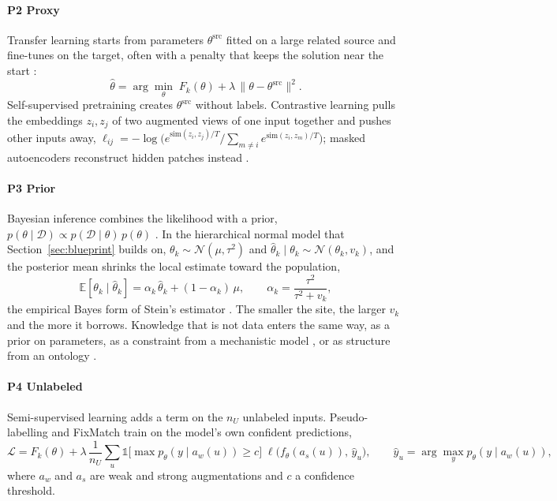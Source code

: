 \documentclass[acmsmall,screen,review]{acmart}
\theoremstyle{acmdefinition}
\begin{document}
\paragraph{P2 Proxy} Transfer learning starts from parameters $\theta^{\mathrm{src}}$ fitted on a large related source and fine-tunes on the target, often with a penalty that keeps the solution near the start \cite{pan2010survey,xuhong2018explicit}:
\begin{equation}\label{eq:finetune}
\hat\theta=\arg\min_\theta\;F_k(\theta)+\lambda\,\|\theta-\theta^{\mathrm{src}}\|^2 .
\end{equation}
Self-supervised pretraining creates $\theta^{\mathrm{src}}$ without labels. Contrastive learning \cite{chen2020simple} pulls the embeddings $z_i,z_j$ of two augmented views of one input together and pushes other inputs away, $\ell_{ij}=-\log\bigl(e^{\mathrm{sim}(z_i,z_j)/T}/\sum_{m\neq i}e^{\mathrm{sim}(z_i,z_m)/T}\bigr)$; masked autoencoders reconstruct hidden patches instead \cite{he2022masked}.

\paragraph{P3 Prior} Bayesian inference combines the likelihood with a prior, $p(\theta\mid\mathcal{D})\propto p(\mathcal{D}\mid\theta)\,p(\theta)$ \cite{gelman2013bayesian}. In the hierarchical normal model that Section~\ref{sec:blueprint} builds on, $\theta_k\sim\mathcal{N}(\mu,\tau^2)$ and $\hat\theta_k\mid\theta_k\sim\mathcal{N}(\theta_k,v_k)$, and the posterior mean shrinks the local estimate toward the population,
\begin{equation}\label{eq:shrink}
\mathbb{E}[\theta_k\mid\hat\theta_k]=\alpha_k\,\hat\theta_k+(1-\alpha_k)\,\mu,\qquad \alpha_k=\frac{\tau^2}{\tau^2+v_k},
\end{equation}
the empirical Bayes form of Stein's estimator \cite{stein1956inadmissibility,efron1973steins}. The smaller the site, the larger $v_k$ and the more it borrows. Knowledge that is not data enters the same way, as a prior on parameters, as a constraint from a mechanistic model \cite{raissi2019physics}, or as structure from an ontology \cite{choi2017gram}.

\paragraph{P4 Unlabeled} Semi-supervised learning adds a term on the $n_U$ unlabeled inputs. Pseudo-labelling \cite{lee2013pseudo} and FixMatch \cite{sohn2020fixmatch} train on the model's own confident predictions,
\begin{equation}\label{eq:fixmatch}
\mathcal{L}=F_k(\theta)+\lambda\,\frac{1}{n_U}\sum_{u}\mathbb{1}\bigl[\max p_\theta(y\mid a_w(u))\ge c\bigr]\;\ell\bigl(f_\theta(a_s(u)),\,\hat y_u\bigr),\qquad \hat y_u=\arg\max_y p_\theta(y\mid a_w(u)),
\end{equation}
where $a_w$ and $a_s$ are weak and strong augmentations and $c$ a confidence threshold.
\end{document}
